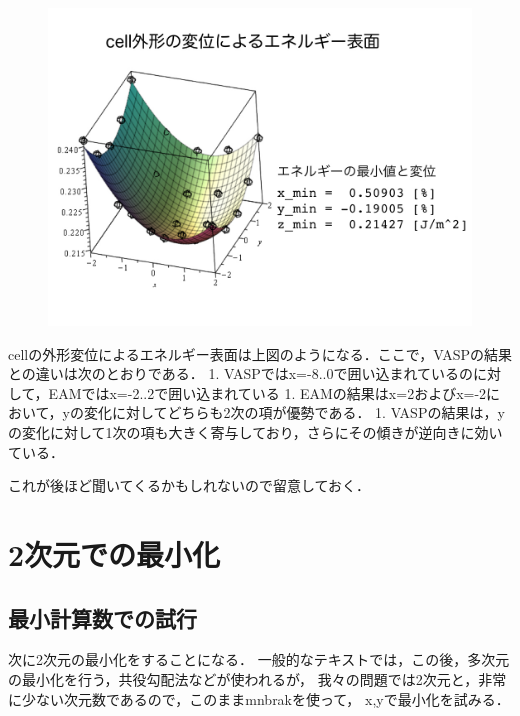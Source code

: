 \begin{figure}[H]
\centering
\begin{center}
\includegraphics[width=150mm]{../.././thesis/thesis.007.jpeg}
\end{center}
\caption{{}}

\label{fig:}
\end{figure}

    cellの外形変位によるエネルギー表面は上図のようになる．ここで，VASPの結果との違いは次のとおりである．
1.
VASPではx=-8..0で囲い込まれているのに対して，EAMではx=-2..2で囲い込まれている
1.
EAMの結果はx=2およびx=-2において，yの変化に対してどちらも2次の項が優勢である．
1.
VASPの結果は，yの変化に対して1次の項も大きく寄与しており，さらにその傾きが逆向きに効いている．

これが後ほど聞いてくるかもしれないので留意しておく．

    \section{2次元での最小化}\label{ux6b21ux5143ux3067ux306eux6700ux5c0fux5316}

\subsection{最小計算数での試行}\label{ux6700ux5c0fux8a08ux7b97ux6570ux3067ux306eux8a66ux884c}

次に2次元の最小化をすることになる．
一般的なテキストでは，この後，多次元の最小化を行う，共役勾配法などが使われるが，
我々の問題では2次元と，非常に少ない次元数であるので，このままmnbrakを使って，
x,yで最小化を試みる．

